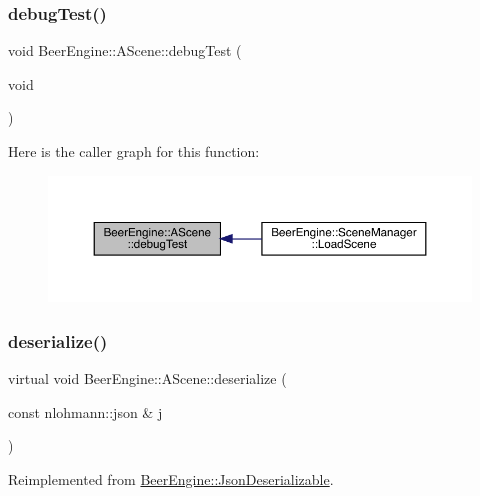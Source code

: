 \subsubsection{\texorpdfstring{debug\+Test()}{debugTest()}}
{\footnotesize\ttfamily void Beer\+Engine\+::\+A\+Scene\+::debug\+Test (\begin{DoxyParamCaption}\item[{void}]{ }\end{DoxyParamCaption})}

Here is the caller graph for this function\+:
\nopagebreak
\begin{figure}[H]
\begin{center}
\leavevmode
\includegraphics[width=350pt]{class_beer_engine_1_1_a_scene_a44f55dbd991eb07e425ca163f4773766_icgraph}
\end{center}
\end{figure}
\mbox{\label{class_beer_engine_1_1_a_scene_a3db491adb7ff57a3a527024fd0a6001f}} 
\subsubsection{\texorpdfstring{deserialize()}{deserialize()}}
{\footnotesize\ttfamily virtual void Beer\+Engine\+::\+A\+Scene\+::deserialize (\begin{DoxyParamCaption}\item[{const nlohmann\+::json \&}]{j }\end{DoxyParamCaption})\hspace{0.3cm}{\ttfamily [virtual]}}



Reimplemented from \mbox{\hyperlink{class_beer_engine_1_1_json_deserializable_ae1ce96bc441e544e7339641d80925726}{Beer\+Engine\+::\+Json\+Deserializable}}.

\mbox{\label{class_beer_engine_1_1_a_scene_af40b9c9c30c3c55991792d45867c022b}} 
